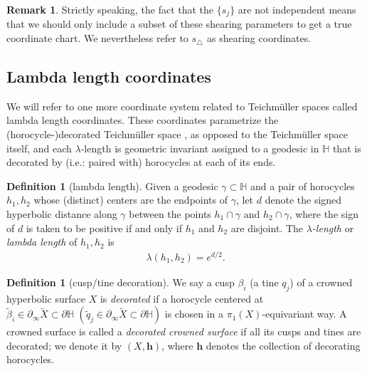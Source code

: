 \documentclass{amsart}
\newcommand{\HH}{\mathbb{H}}
\theoremstyle{definition}
\newtheorem{definition}[proposition]{Definition}
\newtheorem{remark}[proposition]{Remark}
\begin{document}
\begin{remark}
    Strictly speaking, the fact that the $\{s_j\}$ are not independent means that we should only include a subset of these shearing parameters to get a true coordinate chart. We nevertheless refer to $s_\triangle$ as shearing coordinates.
\end{remark}










\subsection{Lambda length coordinates}

We will refer to one more coordinate system related to Teichm\"uller spaces called lambda length coordinates. These coordinates parametrize the (horocycle-)decorated Teichm\"uller space \cite{pennercoords}, as opposed to the Teichm\"uller space itself, and each $\lambda$-length is geometric invariant assigned to a geodesic in $\HH$ that is decorated by (i.e.: paired with) horocycles at each of its ends.


\begin{definition}[lambda length]
Given a geodesic $\gamma\subset\HH$ and a pair of horocycles $h_1, h_2$ whose (distinct) centers are the endpoints of $\gamma$, let $d$ denote the signed hyperbolic distance along $\gamma$ between the points $h_1 \cap \gamma$ and $h_2 \cap \gamma$, where the sign of $d$ is taken to be positive if and only if $h_1$ and $h_2$ are disjoint. The \emph{$\lambda$-length} or \emph{lambda length} of $h_1, h_2$ is
\begin{align}
\label{eq: def lambda length}
\lambda(h_1,h_2) = e^{d/2}.
\end{align}
\end{definition}

\begin{definition}[cusp/tine decoration]
We say a cusp $\beta_i$ (a tine $q_j$) of a crowned hyperbolic surface $X$ is \textit{decorated} if a horocycle centered at $\widetilde{\beta}_i \in \partial_\infty \widetilde{X} \subset \partial \HH \,\,(\widetilde{q}_j \in \partial_\infty \widetilde{X} \subset \partial \HH)$ is chosen in a $\pi_1(X)$-equivariant way. A crowned surface is called a \emph{decorated crowned surface} if all its cusps and tines are decorated; we denote it by $(X,\textbf{h})$, where $\textbf{h}$ denotes the collection of decorating horocycles.
\end{definition}
\end{document}
